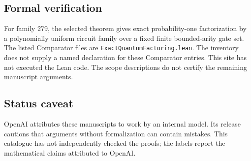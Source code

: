 \documentclass[11pt]{article}
\begin{document}
\subsection{Formal verification}
For family 279, the selected theorem gives exact probability-one factorization by a polynomially uniform circuit family over a fixed finite bounded-arity gate set. The listed Comparator files are \texttt{ExactQuantumFactoring.lean}. The inventory does not supply a named declaration for these Comparator entries. This site has not executed the Lean code. The scope descriptions do not certify the remaining manuscript arguments.

\subsection{Status caveat}
OpenAI attributes these manuscripts to work by an internal model. Its release cautions that arguments without formalization can contain mistakes. This catalogue has not independently checked the proofs; the labels report the mathematical claims attributed to OpenAI.
\end{document}
